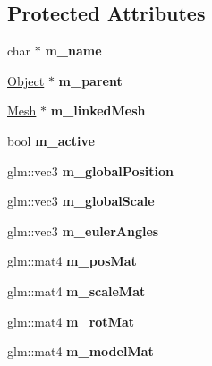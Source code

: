 \subsection*{Protected Attributes}
\begin{DoxyCompactItemize}
\item 
\mbox{\label{class_object_ab37ae04046c449f0a8ab2833cfee5353}} 
char $\ast$ {\bfseries m\+\_\+name}
\item 
\mbox{\label{class_object_a2ee3d966f96dbabae641ad390d82a6f3}} 
\hyperlink{class_object}{Object} $\ast$ {\bfseries m\+\_\+parent}
\item 
\mbox{\label{class_object_a82441da4d382a765bcf9c0a929f0a240}} 
\hyperlink{class_mesh}{Mesh} $\ast$ {\bfseries m\+\_\+linked\+Mesh}
\item 
\mbox{\label{class_object_a9f5194b69d79120761526865270df0a6}} 
bool {\bfseries m\+\_\+active}
\item 
\mbox{\label{class_object_a6628ff13c375c8a2bc9cc36c8585943c}} 
glm\+::vec3 {\bfseries m\+\_\+global\+Position}
\item 
\mbox{\label{class_object_ad717cc77240082806b13cd67338a4923}} 
glm\+::vec3 {\bfseries m\+\_\+global\+Scale}
\item 
\mbox{\label{class_object_a2b740c7fb22122a34286e0181fc69c8a}} 
glm\+::vec3 {\bfseries m\+\_\+euler\+Angles}
\item 
\mbox{\label{class_object_a6efcd32bee6c6acb64292a4798da7c0f}} 
glm\+::mat4 {\bfseries m\+\_\+pos\+Mat}
\item 
\mbox{\label{class_object_a6657aad81115123d8d9bca416d012b46}} 
glm\+::mat4 {\bfseries m\+\_\+scale\+Mat}
\item 
\mbox{\label{class_object_a9d7273efa1fbbe8a45c9042cf70222a5}} 
glm\+::mat4 {\bfseries m\+\_\+rot\+Mat}
\item 
\mbox{\label{class_object_a63576ab555502bfb8de52e0f75b0d012}} 
glm\+::mat4 {\bfseries m\+\_\+model\+Mat}

\end{DoxyCompactItemize}
